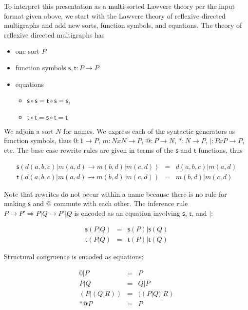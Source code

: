 \documentclass{llncs}
\renewcommand{\:}{\colon}
\newcommand{\red}{\rightarrow}
\begin{document}
To interpret this presentation as a multi-sorted Lawvere theory per
the input format given above, we start with the Lawvere theory of
reflexive directed multigraphs and add new sorts, function symbols,
and equations.  The theory of reflexive directed multigraphs has

\begin{itemize}
  \item one sort $P$
  \item function symbols $\mathsf{s}, \mathsf{t} : P \rightarrow P$
  \item equations
    \begin{itemize}
      \item $\mathsf{s} \circ \mathsf{s} = \mathsf{t} \circ \mathsf{s} = \mathsf{s}$,
      \item $\mathsf{t} \circ \mathsf{t} = \mathsf{s} \circ \mathsf{t} = \mathsf{t} $
    \end{itemize}
\end{itemize}

We adjoin a sort $N$ for names. We express each of the syntactic generators as function symbols, thus $0 : 1 \rightarrow P$, $m : N x N \rightarrow P$, $@:P \rightarrow N$, $*:N \rightarrow P$, $|:P x P \rightarrow  P$, etc. The base case rewrite rules are given in terms of the $\mathsf{s}$ and $\mathsf{t}$ functions, thus 

\begin{eqnarray*}
  \mathsf{s}( d(a, b, c) | m(a,d) \red m(b,d) | m(c,d) ) & = & d(a, b, c) | m(a,d) \\
  \mathsf{t}( d(a, b, c) | m(a,d) \red m(b,d) | m(c,d) ) & = & m(b,d) | m(c,d)
\end{eqnarray*}

Note that rewrites do not occur within a name because there is no rule for making $\mathsf{s}$ and $@$ commute with each other.
The inference rule $P \red P' \Rightarrow P|Q \red P'|Q$ is encoded as an equation involving $\mathsf{s}$, $\mathsf{t}$, and $|$:

\begin{eqnarray*}
  \mathsf{s}( P | Q ) & = & \mathsf{s}(P) | \mathsf{s}(Q) \\
  \mathsf{t}( P | Q ) & = & \mathsf{t}(P) | \mathsf{t}(Q)
\end{eqnarray*}

Structural congruence is encoded as equations:

\begin{eqnarray*}
  0 | P & = & P \\
  P | Q & = & Q | P \\
 (P | (Q | R)) & = & ((P | Q) | R) \\
  *@P & = & P
\end{eqnarray*}
\end{document}
